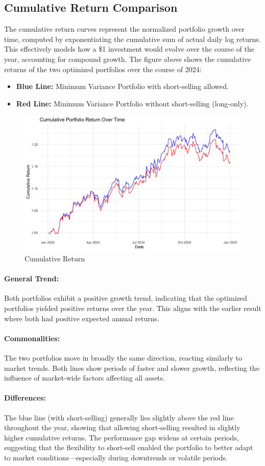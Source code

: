 \documentclass[11pt]{article}
\begin{document}
\subsection*{Cumulative Return Comparison}
The cumulative return curves represent the normalized portfolio growth over time, computed by exponentiating the cumulative sum of actual daily log returns. This effectively models how a \$1 investment would evolve over the course of the year, accounting for compound growth.
The figure above shows the cumulative returns of the two optimized portfolios over the course of 2024:
\begin{itemize}
    \item \textbf{Blue Line:} Minimum Variance Portfolio with short-selling allowed.
    \item \textbf{Red Line:} Minimum Variance Portfolio without short-selling (long-only).
\end{itemize}
\begin{figure} [H]
    \centering
    \includegraphics[width=0.6\linewidth]{Findings_Yutong/cumulative_return.png}
    \caption{Cumulative Return}
    \label{cum-return}
\end{figure}
     \paragraph{General Trend:} Both portfolios exhibit a positive growth trend, indicating that the optimized portfolios yielded positive returns over the year. This aligns with the earlier result where both had positive expected annual returns.
    \paragraph{Commonalities:}The two portfolios move in broadly the same direction, reacting similarly to market trends. Both lines show periods of faster and slower growth, reflecting the influence of market-wide factors affecting all assets.
    \paragraph{Differences:} The blue line (with short-selling) generally lies slightly above the red line throughout the year, showing that allowing short-selling resulted in slightly higher cumulative returns. The performance gap widens at certain periods, suggesting that the flexibility to short-sell enabled the portfolio to better adapt to market conditions—especially during downtrends or volatile periods.
\end{document}
